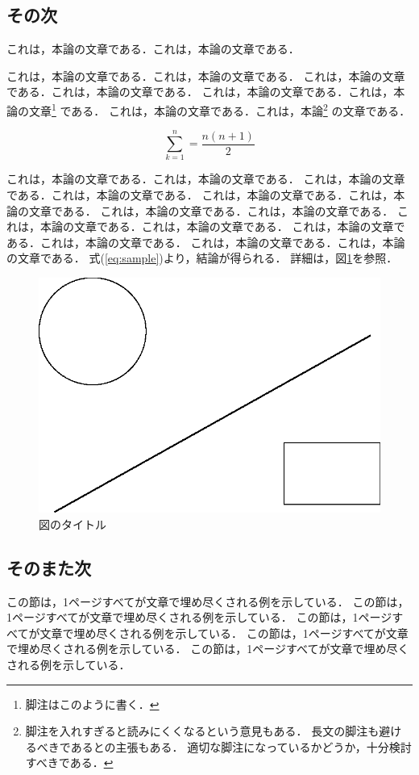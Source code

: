 \subsection{その次}

これは，本論の文章である．これは，本論の文章である．

これは，本論の文章である．これは，本論の文章である．
これは，本論の文章である．これは，本論の文章である．
これは，本論の文章である．これは，本論の文章\footnote{
脚注はこのように書く．}
である．
これは，本論の文章である．これは，本論\footnote{
脚注を入れすぎると読みにくくなるという意見もある．
長文の脚注も避けるべきであるとの主張もある．
適切な脚注になっているかどうか，十分検討すべきである．}
の文章である．

\begin{equation}\label{eq:sample}
 \sum_{k = 1}^{n} = \frac{n(n+1)}{2}
\end{equation}

これは，本論の文章である．これは，本論の文章である．
これは，本論の文章である．これは，本論の文章である．
これは，本論の文章である．これは，本論の文章である．
これは，本論の文章である．これは，本論の文章である．
これは，本論の文章である．これは，本論の文章である．
これは，本論の文章である．これは，本論の文章である．
これは，本論の文章である．これは，本論の文章である．
式(\ref{eq:sample})より，結論が得られる．
詳細は，図\ref{figure:sample}を参照．

\begin{figure}[tbp]
 \begin{center}
  \includegraphics[width=0.5\columnwidth]{fig.eps}
 \end{center}
 \caption{\label{figure:sample}図のタイトル}
\end{figure}

\subsection{そのまた次}

この節は，1ページすべてが文章で埋め尽くされる例を示している．
この節は，1ページすべてが文章で埋め尽くされる例を示している．
この節は，1ページすべてが文章で埋め尽くされる例を示している．
この節は，1ページすべてが文章で埋め尽くされる例を示している．
この節は，1ページすべてが文章で埋め尽くされる例を示している．

